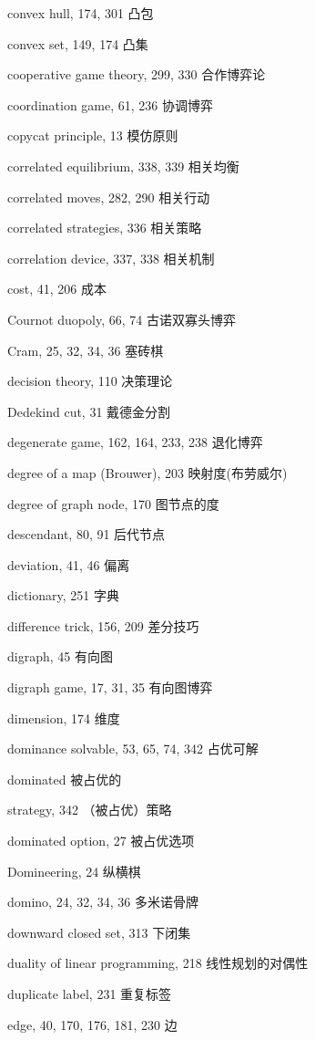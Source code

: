 convex hull, 174, 301  凸包

convex set, 149, 174  凸集




cooperative game theory, 299, 330  合作博弈论

coordination game, 61, 236 协调博弈

copycat principle, 13 模仿原则

correlated equilibrium, 338, 339 相关均衡

correlated moves, 282, 290 相关行动

correlated strategies, 336 相关策略

correlation device, 337, 338 {\color{blue}相关机制}

cost, 41, 206 成本

Cournot duopoly, 66, 74 古诺双寡头博弈

Cram, 25, 32, 34, 36 {\color{blue} 塞砖棋}

decision theory, 110 决策理论

Dedekind cut, 31 戴德金分割

degenerate game, 162, 164, 233, 238 退化博弈

degree of a map (Brouwer), 203 映射度(布劳威尔)

degree of graph node, 170 图节点的度

descendant, 80, 91 后代节点

deviation, 41, 46 偏离

dictionary, 251 字典

difference trick, 156, 209 差分技巧

digraph, 45 有向图

digraph game, 17, 31, 35 有向图博弈

dimension, 174 维度

dominance solvable, 53, 65, 74, 342 占优可解

dominated 被占优的

\qquad strategy, 342 （被占优）策略

dominated option, 27 被占优选项

Domineering, 24 纵横棋

domino, 24, 32, 34, 36 多米诺骨牌

downward closed set, 313 下闭集

duality of linear programming, 218 线性规划的对偶性

duplicate label, 231 重复标签

edge, 40, 170, 176, 181, 230 边

